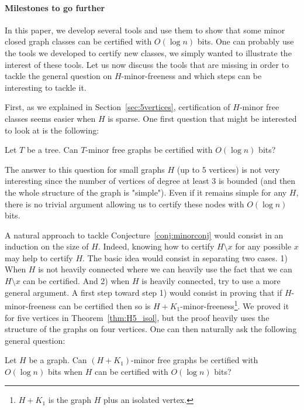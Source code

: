 \documentclass[a4paper,thm-restate,USenglish]{lipics-v2019}
\begin{document}
\paragraph*{Milestones to go further}
In this paper, we develop several tools and use them to show that some minor closed graph classes can be certified with $O(\log n)$ bits. One can probably use the tools we developed to certify new classes, we simply wanted to illustrate the interest of these tools. 
Let us now discuss the tools that are missing in order to tackle the general question on $H$-minor-freeness and which steps can be interesting to tackle it.

First, as we explained in Section~\ref{sec:5vertices}, certification of $H$-minor free classes seems easier when $H$ is sparse. One first question that might be interested to look at is the following:

\begin{question}\label{ques:tree}
Let $T$ be a tree. Can $T$-minor free graphs be certified with $O(\log n)$ bits? 
\end{question}

The answer to this question for small graphs $H$ (up to $5$ vertices) is not very interesting since the number of vertices of degree at least $3$ is bounded (and then the whole structure of the graph is "simple"). Even if it remains simple for any $H$, there is no trivial argument allowing us to certify these nodes with $O(\log n)$ bits.
\medskip

A natural approach to tackle Conjecture~\ref{conj:minorconj} would consist in an induction on the size of $H$. Indeed, knowing how to certify $H \setminus x$ for any possible $x$ may help to certify $H$. The basic idea would  consist in separating two cases. 1) When $H$ is not heavily connected where we can heavily use the fact that we can $H \setminus x$ can be certified. And 2) when $H$ is heavily connected, try to use a more general argument. 
A first step toward step 1) would consist in proving that if $H$-minor-freeness can be certified then so is $H+K_1$-minor-freeness\footnote{$H+K_1$ is the graph $H$ plus an isolated vertex.}. We proved it for five vertices in Theorem~\ref{thm:H5_isol}, but the proof heavily uses the structure of the graphs on four vertices. One can then naturally ask the following general question:

\begin{question}\label{quest:H+K1}
Let $H$ be a graph. Can $(H+K_1)$-minor free graphs be certified with $O(\log n)$ bits when $H$ can be certified with $O(\log n)$ bits? 
\end{question}
\end{document}
